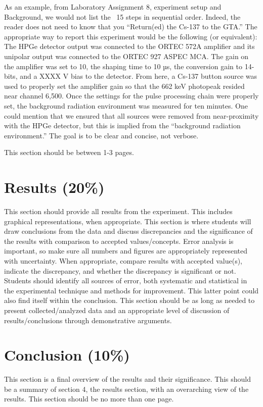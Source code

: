 \documentclass[12pt]{article}
\begin{document}
As an example, from Laboratory Assignment 8, experiment setup and Background, we would not list the ~15 steps in sequential order. Indeed, the reader does not need to know that you “Return(ed) the Cs-137 to the GTA.” The appropriate way to report this experiment would be the following (or equivalent): The HPGe detector output was connected to the ORTEC 572A amplifier and its unipolar output was connected to the ORTEC 927 ASPEC MCA. The gain on the amplifier was set to 10, the shaping time to 10 µs, the conversion gain to 14-bits, and a XXXX V bias to the detector. From here, a Cs-137 button source was used to properly set the amplifier gain so that the 662 keV photopeak resided near channel 6,500. Once the settings for the pulse processing chain were properly set, the background radiation environment was measured for ten minutes. One could mention that we ensured that all sources were removed from near-proximity with the HPGe detector, but this is implied from the “background radiation environment.” The goal is to be clear and concise, not verbose. 

This section should be between 1-3 pages.

\section{Results (20\%)}
This section should provide all results from the experiment. This includes graphical representations, when appropriate. This section is where students will draw conclusions from the data and discuss discrepancies and the significance of the results with comparison to accepted values/concepts. Error analysis is important, so make sure all numbers and figures are appropriately represented with uncertainty. When appropriate, compare results with accepted value(s), indicate the discrepancy, and whether the discrepancy is significant or not. Students should identify all sources of error, both systematic and statistical in the experimental technique and methods for improvement. This latter point could also find itself within the conclusion. This section should be as long as needed to present collected/analyzed data and an appropriate level of discussion of results/conclusions through demonstrative arguments.

\section{Conclusion (10\%)}
This section is a final overview of the results and their significance. This should be a summary of section 4, the results section, with an overarching view of the results. This section should be no more than one page.
\end{document}
